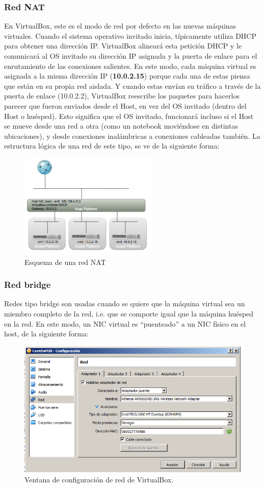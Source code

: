 \documentclass[11pt]{article}
\begin{document}
\subsubsection{Red NAT}
En VirtualBox, este es el modo de red por defecto en las nuevas máquinas virtuales. Cuando el sistema operativo invitado inicia, típicamente utiliza DHCP para obtener una dirección IP. VirtualBox alineará esta petición DHCP y le comunicará al OS invitado su dirección IP asignada y la puerta de enlace para el enrutamiento de las conexiones salientes. En este modo, cada máquina virtual es asignada a la misma dirección IP (\textbf{10.0.2.15}) porque cada una de estas piensa que están en su propia red aislada. Y cuando estas envían su tráfico a través de la puerta de enlace (10.0.2.2), VirtualBox reescribe los paquetes para hacerlos parecer que fueron enviados desde el Host, en vez del OS invitado (dentro del Host o huésped).
Esto significa que el OS invitado, funcionará incluso si el Host se mueve desde una red a otra (como un notebook moviéndose en distintas ubicaciones), y desde conexiones inalámbricas a conexiones cableadas también. La estructura lógica de una red de este tipo, se ve de la siguiente forma:


	\begin{figure}[ht]
	\center
	\includegraphics[width=0.5\linewidth, height=5cm]{screenshots/networking/nat/nat-network.png} 
	\caption{Esquema de una red NAT}
	\end{figure}

\subsubsection{Red bridge}
	Redes tipo bridge son usadas cuando se quiere que la máquina virtual sea un miembro completo de la red, i.e. que se comporte igual que la máquina huésped en la red. En este modo, un NIC virtual es ``puenteado'' a un NIC físico en el host, de la siguiente forma:

	\clearpage

	\begin{figure}[ht]
	\center
	\includegraphics[width=0.5\linewidth]{screenshots/networking/bridge/MIN/bridge-mv-min.png}
	\caption{Ventana de configuración de red de VirtualBox.}
	\end{figure}
\end{document}
